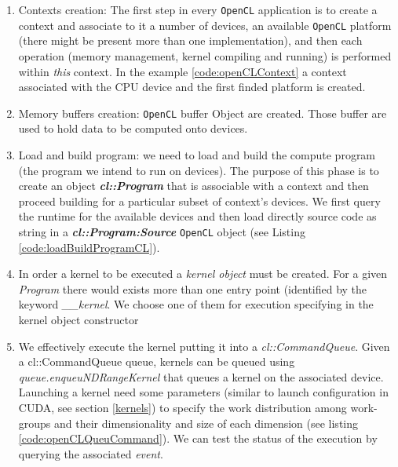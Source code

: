     \begin{enumerate}
    	\item Contexts creation: The first step in every \texttt{OpenCL} application is to create a context and associate to it a number of devices, an available \texttt{OpenCL} platform (there might be present more than one implementation), and then each operation (memory management, kernel compiling and running) is performed within \emph{this} context. In the example \ref{code:openCLContext} a context associated with the CPU device and the first finded platform is created.\\

    	\item Memory buffers creation: \texttt{OpenCL} buffer Object are created. Those
    	buffer are used to hold data to be computed onto devices.\\
    	
    	\item Load and build program: we need to load and build the compute program
    	(the program we intend to run on devices). The purpose of this phase is to
    	create an object \textbf{\textit{cl::Program}} that is associable with a
    	context and then proceed building for a particular subset of
    	context's devices. We first query the runtime for the available devices and
    	then load directly source code as string in a
    	\textbf{\textit{cl::Program:Source}} \texttt{OpenCL} object (see Listing
    	\ref{code:loadBuildProgramCL}).\\
    	
    	\item In order a kernel to be executed a \emph{kernel object} must be created.
    	For a given \emph{Program} there would exists more than one entry point
    	(identified by the keyword \emph{\_\_kernel}. We choose one of them for
    	execution specifying in the kernel object constructor\\
    	
    	\item We effectively execute the kernel putting it into a 
    	\emph{cl::CommandQueue}. Given a cl::CommandQueue queue, kernels can be queued
    	using \textit{queue.enqueu\-NDRangeKernel} that queues a kernel on
    	the associated device.
    	Launching a kernel need some parameters (similar to launch configuration in
    	CUDA, see section \ref{kernels}) to specify the work distribution among
    	work-groups and their dimensionality and size of each dimension (see listing
    	\ref{code:openCLQueuCommand}). We can test the status of the execution by
    	querying the associated \emph{event}.\\
    \end{enumerate}
    
